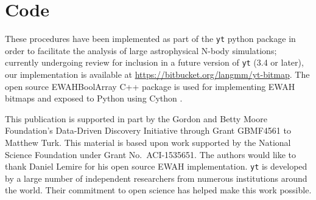 \documentclass[apjl]{emulateapj}
\newcommand{\todo}[1]{{\color{red}{#1}}}
\begin{document}
\section{Code}\label{S:code}
These procedures have been implemented as part of the {\tt yt} python package
\citep{Turk20d11a} in order to facilitate the analysis of large astrophysical
N-body simulations; currently undergoing review for inclusion in a future version of {\tt yt} (3.4 or later), our implementation is available at \url{https://bitbucket.org/langmm/yt-bitmap}. The open source EWAHBoolArray C++ package is used for implementing EWAH bitmaps \citep{Lemire2010,Kaser2016} and exposed to Python using Cython \citep{Behnel2011}. 

\acknowledgments
This publication is supported in part by the Gordon and Betty Moore
Foundation’s Data-Driven Discovery Initiative through Grant GBMF4561 to Matthew
Turk.  This material is based upon work supported by the National Science
Foundation under Grant No.~ACI-1535651.  The authors would like to thank Daniel
Lemire for his open source EWAH implementation.  {\tt yt} is developed by a
large number of independent researchers from numerous institutions around the
world.  Their commitment to open science has helped make this work possible.

\ifdraft
	
\else
	
\fi

\ifplacefig
\else
\fi

\end{document}

